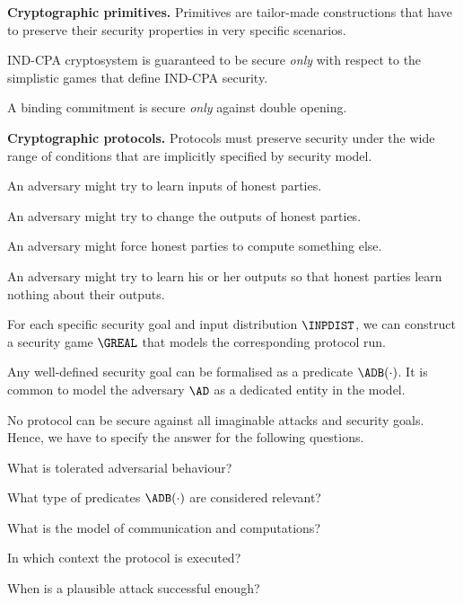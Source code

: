 \documentclass[landscape,footrule]{foils}
\newcommand{\spreadappart}{\vspace*{\fill}}
\begin{document}
\titlefoil

\LogoOn

\textbf{Cryptographic primitives.} Primitives are tailor-made
constructions that have to preserve their security properties in very
specific scenarios.
\begin{triangles}
\item IND-CPA cryptosystem is guaranteed to be secure \emph{only}
  with respect to the simplistic games that define IND-CPA security.
\item A binding commitment is secure \emph{only} against double opening. 
\end{triangles}\vspace*{3ex}

\textbf{Cryptographic protocols.} Protocols must preserve 
security  under the wide range of conditions that are
implicitly specified by security model.
\begin{triangles}
\item An adversary might try to learn inputs of honest parties. 
\item An adversary might try to change the outputs of honest parties.
\item An adversary might force honest parties to compute something else.
\item An adversary might try to learn his or her outputs so that
  honest parties learn nothing about their outputs.
\end{triangles}


For each specific security goal and input distribution $\INPDIST$, we
can construct a security game $\GREAL$ that models the corresponding
protocol run.
\bigskip

\vspace*{-2ex}

Any well-defined security goal can be formalised as a predicate
$\ADB(\cdot)$. It is common to model the adversary $\AD$ as a dedicated entity in
the model.


No protocol can be secure against all imaginable attacks and security
goals. Hence, we have to specify the answer for the following
questions.
\begin{diamonds}
  \item What is tolerated adversarial behaviour? 
  \item What type of predicates $\ADB(\cdot)$ are considered relevant?
  \item What is the model of communication and computations?
  \item In which context the protocol is executed?
  \item When is a plausible attack successful enough?
\end{diamonds}
\Bigskip
\spreadappart
\end{document}
